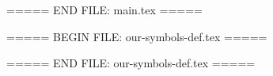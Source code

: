 \clearpage
\newpage


===== END FILE: main.tex =====

===== BEGIN FILE: our-symbols-def.tex =====
\newcommand{\lamb}{\ensuremath{\Lbar}\xspace}

\newcommand{\lam}{\ensuremath{\Lambda}\xspace}

\newcommand{\lamp}{\ensuremath{\Lbar p}\xspace}

\newcommand{\mB}{\ensuremath{m(\Lbar p \mu^{+}\mu^{-})}\xspace}

\newcommand{\mMM}{\ensuremath{m(\mu^{+}\mu^{-})}\xspace}

\newcommand{\ch}{\ensuremath{\chi^2}\xspace}


\newcommand{\more}{\ensuremath{>}\xspace}
\newcommand{\less}{\ensuremath{<}\xspace}
\newcommand{\plam}{\ensuremath{p\Lbar}\xspace}

\newcommand{\btsll}{\decay{b}{s\ell^+ \ell^-}}


\newcommand{\btlpmm}{\decay{B^{+}}{\Lbar p \mu^{+} \mu^{-}}}


\newcommand{\btlpnunu}{\decay{B^{+}}{\Lbar p \nu \bar{\nu}}}


\newcommand{\btlpgamma}{\decay{B^{+}}{\Lbar p \gamma}}


\newcommand{\btplgamma}{\decay{B^{+}}{p \Lbar \gamma}}


\newcommand{\btlpjpsi}{\decay{B^{+}}{\Lbar p \jpsi}}


\newcommand{\btjpsilp}{\decay{B^{+}}{\jpsi \Lbar p}}


\newcommand{\btlpjpsimm}{\decay{B^{+}}{\Lbar p \jpsi(\to \mu^{+} \mu^{-})}}


\newcommand{\btjpsimmlp}{\decay{B^{+}}{\jpsi(\to \mu^{+} \mu^{-}) \Lbar p}}


\newcommand{\btlppipi}{\decay{B^{+}}{\Lbar p \pi^{+} \pi^{-}}}


\newcommand{\btlpkk}{\decay{B^{+}}{\Lbar p K^{+} K^{-}}}


\newcommand{\btlpkpkp}{\decay{B^{+}}{\Lambda \bar{p} K^{+} K^{+}}}


\newcommand{\btlcppi}{\decay{B^{+}}{\Lbar^{-}_{c}(\to \Lbar \mu^{-} \bar{\nu}_{\mu}) p \pi^{+}}}


\newcommand{\lbtlzjpsi}{\decay{\Lambda_b}{\Lambda^0 \jpsi}}


\newcommand{\btksjpsi}{\decay{B^0}{K_s^0 J/\psi}}


\newcommand{\jpsimm}{\decay{J/\psi}{\mu^{+} \mu^{-}}}
===== END FILE: our-symbols-def.tex =====

